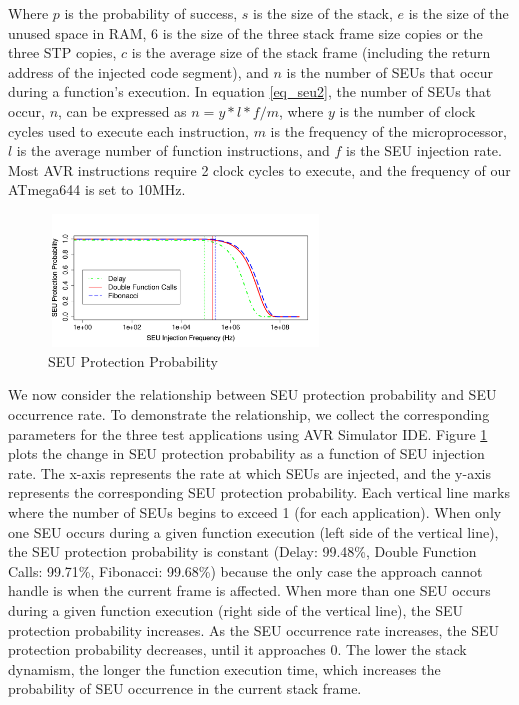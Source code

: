 Where $p$ is the probability of success, $s$ is the size of the stack, $e$ is the size of the unused space in RAM, $6$ is the size of the three stack frame size copies or the three STP copies, $c$ is the average size of the stack frame (including the return address of the injected code segment), and $n$ is the number of SEUs that occur during a function's execution. In equation \ref{eq_seu2}, the number of SEUs that occur, $n$, can be expressed as $n=y*l*f/m$, where $y$ is the number of clock cycles used to execute each instruction, $m$ is the frequency of the microprocessor, $l$ is the average number of function instructions, and $f$ is the SEU injection rate. Most AVR instructions require 2 clock cycles to execute, and the frequency of our ATmega644 is set to 10MHz.
\vspace{-20pt}
\begin{figure}
\centering
\includegraphics[width=0.65\textwidth, height=100pt]{figures/success_probability_v2.pdf}
\vspace{-5pt}
\caption{SEU Protection Probability}
\label{fig:success_probability}
\end{figure}
\vspace{-25pt}

We now consider the relationship between SEU protection probability and SEU occurrence rate. To demonstrate the relationship, we collect the corresponding parameters for the three test applications using AVR Simulator IDE. Figure \ref{fig:success_probability} plots the change in SEU protection probability as a function of SEU injection rate. The x-axis represents the rate at which SEUs are injected, and the y-axis represents the corresponding SEU protection probability. Each vertical line marks where the number of SEUs begins to exceed 1 (for each application). When only one SEU occurs during a given function execution (left side of the vertical line), the SEU protection probability is constant (Delay: 99.48\%, Double Function Calls: 99.71\%, Fibonacci: 99.68\%) because the only case the approach cannot handle is when the current frame is affected. When more than one SEU occurs during a given function execution (right side of the vertical line), the SEU protection probability increases. As the SEU occurrence rate increases, the SEU protection probability decreases, until it approaches 0. The lower the stack dynamism, the longer the function execution time, which increases the probability of SEU occurrence in the current stack frame.
\vspace{-25pt}
